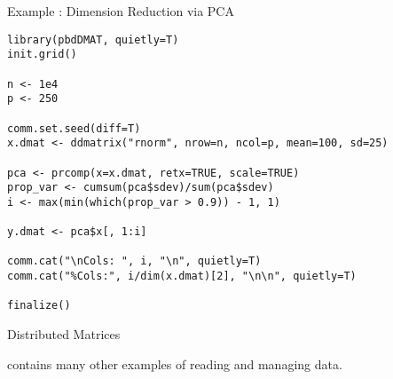 \begin{frame}[fragile]
\fontsize{8pt}{7.2}\selectfont
  \begin{exampleblock}{Example \countex:  Dimension Reduction via PCA}
\begin{lstlisting}
library(pbdDMAT, quietly=T)
init.grid()

n <- 1e4
p <- 250

comm.set.seed(diff=T)
x.dmat <- ddmatrix("rnorm", nrow=n, ncol=p, mean=100, sd=25)

pca <- prcomp(x=x.dmat, retx=TRUE, scale=TRUE)
prop_var <- cumsum(pca$sdev)/sum(pca$sdev)
i <- max(min(which(prop_var > 0.9)) - 1, 1)

y.dmat <- pca$x[, 1:i]

comm.cat("\nCols: ", i, "\n", quietly=T)
comm.cat("%Cols:", i/dim(x.dmat)[2], "\n\n", quietly=T)

finalize()
\end{lstlisting} %
  \end{exampleblock}
\end{frame}



\begin{frame}
  \begin{block}{Distributed Matrices}\pause
  \begin{center}
     contains many other examples of reading and managing data.
  \end{center}
  \end{block}
\end{frame}


